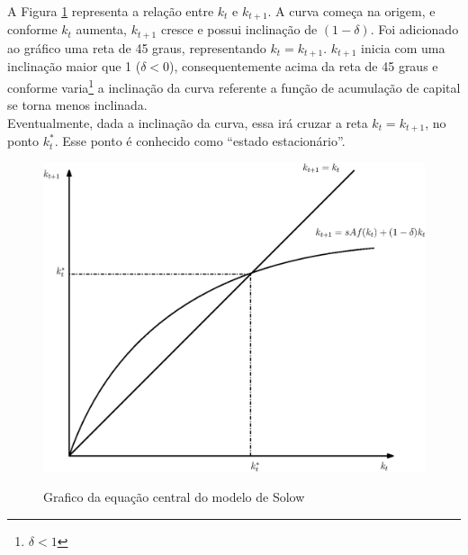 \documentclass[11pt,a4paper]{article}
\begin{document}
A Figura \ref{fig:eqcentral} representa a relação entre $k_t$ e $k_{t+1}$. A curva começa na origem, e conforme $k_t$ aumenta, $k_{t+1}$ cresce e possui inclinação de $(1-\delta)$. Foi adicionado ao gráfico uma reta de 45 graus, representando $k_t = k_{t+1}$. $k_{t+1}$ inicia com uma inclinação maior que 1 ($\delta < 0$), consequentemente acima da reta de 45 graus e conforme varia\footnote{$\delta < 1$} a inclinação da curva referente a função de acumulação de capital se torna menos inclinada.\\

Eventualmente, dada a inclinação da curva, essa irá cruzar a reta $k_t = k_{t+1}$, no ponto $k_t ^{\ast}$. Esse ponto é conhecido como ``estado estacionário''. \\



\begin{figure}[!h]
\centering
\caption{Grafico da equação central do modelo de Solow} \vspace{2ex}
\includegraphics[scale=.7]{solow01.eps}
\label{fig:eqcentral}
\end{figure} 


 
\end{document}

